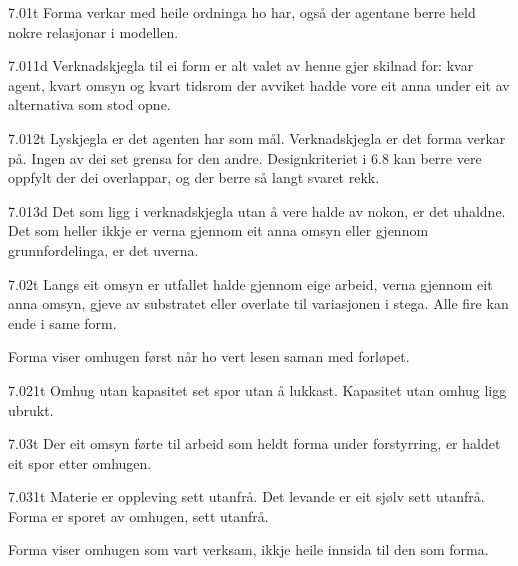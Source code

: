 \begin{formproposition}{7.01}{t}
Forma verkar med heile ordninga ho har, også der agentane berre held nokre relasjonar i modellen.
\end{formproposition}

\begin{formproposition}{7.011}{d}
Verknadskjegla til ei form er alt valet av henne gjer skilnad for: kvar agent, kvart omsyn og kvart tidsrom der avviket hadde vore eit anna under eit av alternativa som stod opne.
\end{formproposition}

\begin{formproposition}{7.012}{t}
Lyskjegla er det agenten har som mål. Verknadskjegla er det forma verkar på. Ingen av dei set grensa for den andre. Designkriteriet i 6.8 kan berre vere oppfylt der dei overlappar, og der berre så langt svaret rekk.
\end{formproposition}

\begin{formproposition}{7.013}{d}
Det som ligg i verknadskjegla utan å vere halde av nokon, er det uhaldne. Det som heller ikkje er verna gjennom eit anna omsyn eller gjennom grunnfordelinga, er det uverna.
\end{formproposition}

\begin{formproposition}{7.02}{t}
Langs eit omsyn er utfallet halde gjennom eige arbeid, verna gjennom eit anna omsyn, gjeve av substratet eller overlate til variasjonen i stega. Alle fire kan ende i same form.

Forma viser omhugen først når ho vert lesen saman med forløpet.
\end{formproposition}

\begin{formproposition}{7.021}{t}
Omhug utan kapasitet set spor utan å lukkast. Kapasitet utan omhug ligg ubrukt.
\end{formproposition}

\begin{formproposition}{7.03}{t}
Der eit omsyn førte til arbeid som heldt forma under forstyrring, er haldet eit spor etter omhugen.
\end{formproposition}

\begin{formproposition}{7.031}{t}
Materie er oppleving sett utanfrå. Det levande er eit sjølv sett utanfrå. Forma er sporet av omhugen, sett utanfrå.

Forma viser omhugen som vart verksam, ikkje heile innsida til den som forma.
\end{formproposition}

